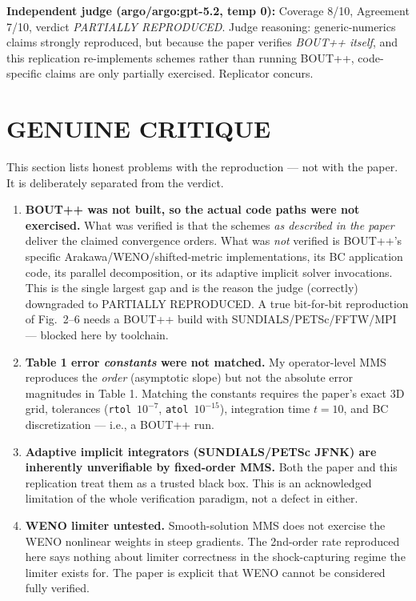 \documentclass[11pt]{article}
\begin{document}
\smallskip
\noindent\textbf{Independent judge (argo/argo:gpt-5.2, temp 0):} Coverage 8/10, Agreement 7/10, verdict \emph{PARTIALLY REPRODUCED}. Judge reasoning: generic-numerics claims strongly reproduced, but because the paper verifies \emph{BOUT++ itself}, and this replication re-implements schemes rather than running BOUT++, code-specific claims are only partially exercised. Replicator concurs.

\section{GENUINE CRITIQUE}
This section lists honest problems with the reproduction --- not with the paper. It is deliberately separated from the verdict.

\begin{enumerate}
  \item \textbf{BOUT++ was not built, so the actual code paths were not exercised.} What was verified is that the schemes \emph{as described in the paper} deliver the claimed convergence orders. What was \emph{not} verified is BOUT++'s specific Arakawa/WENO/shifted-metric implementations, its BC application code, its parallel decomposition, or its adaptive implicit solver invocations. This is the single largest gap and is the reason the judge (correctly) downgraded to PARTIALLY REPRODUCED. A true bit-for-bit reproduction of Fig.~2--6 needs a BOUT++ build with SUNDIALS/PETSc/FFTW/MPI --- blocked here by toolchain.
  \item \textbf{Table 1 error \emph{constants} were not matched.} My operator-level MMS reproduces the \emph{order} (asymptotic slope) but not the absolute error magnitudes in Table 1. Matching the constants requires the paper's exact 3D grid, tolerances (\texttt{rtol}~$10^{-7}$, \texttt{atol}~$10^{-15}$), integration time $t=10$, and BC discretization --- i.e., a BOUT++ run.
  \item \textbf{Adaptive implicit integrators (SUNDIALS/PETSc JFNK) are inherently unverifiable by fixed-order MMS.} Both the paper and this replication treat them as a trusted black box. This is an acknowledged limitation of the whole verification paradigm, not a defect in either.
  \item \textbf{WENO limiter untested.} Smooth-solution MMS does not exercise the WENO nonlinear weights in steep gradients. The 2nd-order rate reproduced here says nothing about limiter correctness in the shock-capturing regime the limiter exists for. The paper is explicit that WENO cannot be considered fully verified.

\end{enumerate}
\end{document}
